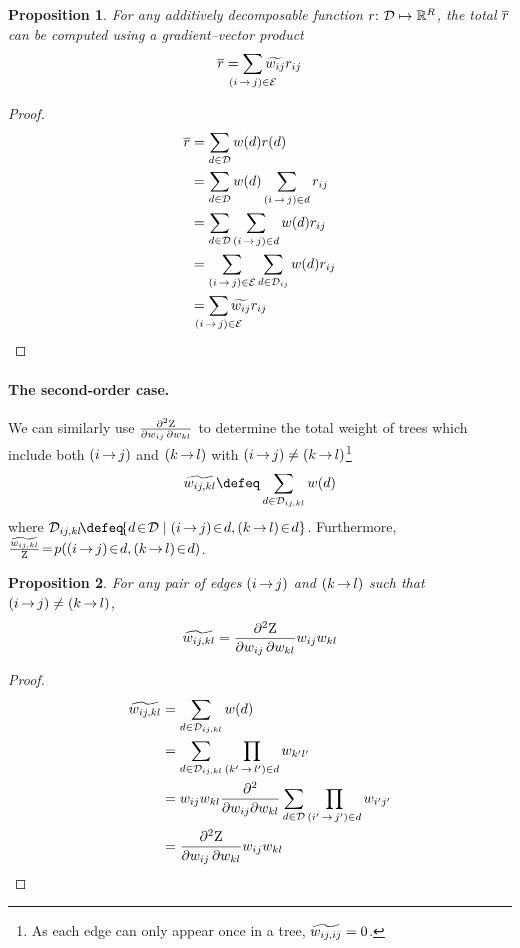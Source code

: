 \documentclass[11pt,a4paper]{article}
\newtheorem{prop}{Proposition}
\theoremstyle{definition}
\begin{document}
\begin{prop}
\label{prop:rbar}
For any additively decomposable function $r{:}\,\,{\mathcal{D}} \mapsto \mathbb{R}^{{R}}$, the total ${\overline{r}}$ can be computed using a gradient--vector product
\begin{equation}
    \rbar = \smashoperator{\sum_{\edgeij\in\edges}}\totalw{ij}\redge{ij}
\end{equation}
\end{prop}
\begin{proof}
\begin{align*}
    \rbar &= \sumtree\wtree{\tree}\rtree{\tree} \\
    &= \sumtree\wtree{\tree}\sum_{\edgeij\in \tree} \redge{ij} \\
    &= \sumtree\sum_{\edgeij\in \tree}\wtree{\tree}\redge{ij} \\
    &= \sum_{\edgeij\in\edges}\sum_{\tree\in\inc{ij}}\wtree{\tree}\redge{ij} \\
    &= \smashoperator{\sum_{\edgeij\in\edges}}\totalw{ij}\redge{ij}
\end{align*}
\end{proof}

\paragraph{The second-order case.}
We can similarly use $\frac{\partial^2 {\mathrm{Z}}}{\partial {w_{ij}}\, \partial {w_{kl}}}$ to determine the total weight of trees which include both ${(i\,{\rightarrow}\,j)}$ and ${(k\,{\rightarrow}\,l)}$ with ${(i\,{\rightarrow}\,j)} \ne {(k\,{\rightarrow}\,l)}$\footnote{As each edge can only appear once in a tree, ${\widetilde{w_{ij,ij}}}=0$.}
\begin{equation}
    \totalw{ij,kl}\defeq\sum_{\tree\in\inc{ij,kl}}\wtree{\tree}
\end{equation}
where $\inc{ij,kl} \!\defeq\! \{ \tree \!\in\! \st \mid \edgeij \!\in\! \tree, \edgekl \!\in\! \tree \}$.
Furthermore, $\frac{{\widetilde{w_{ij,kl}}}}{{\mathrm{Z}}} \!=\! p( {(i\,{\rightarrow}\,j)} \!\in\! {d}, {(k\,{\rightarrow}\,l)} \!\in\! {d})$.

\begin{prop}
\label{prop:second-weight}
For any pair of edges ${(i\,{\rightarrow}\,j)}$ and ${(k\,{\rightarrow}\,l)}$ such that ${(i\,{\rightarrow}\,j)}\neq{(k\,{\rightarrow}\,l)}$,
\begin{equation}\label{eq:total2}
    {\widetilde{w_{ij,kl}}}=\frac{\partial^2 {\mathrm{Z}}}{\partial {w_{ij}}\,\partial{w_{kl}}}{w_{ij}}{w_{kl}}
\end{equation}
\end{prop}
\begin{proof}
\begin{align*}
    {\widetilde{w_{ij,kl}}} &= \sum_{{d}\in{\mathcal{D}_{ij,kl}}}{w({d})} \\
    &= \sum_{{d}\in{\mathcal{D}_{ij,kl}}}\prod_{{(k'\,{\rightarrow}\,l')}\in{d}}{w_{k'l'}} \\
    &= {w_{ij}}{w_{kl}}\frac{\partial^2}{\partial{w_{ij}}\partial{w_{kl}}} \sum_{{d} \in {\mathcal{D}}}\prod_{{(i'\,{\rightarrow}\,j')}\in{d}}{w_{i'j'}} \\
    &= \frac{\partial^2 {\mathrm{Z}}}{\partial {w_{ij}}\,\partial{w_{kl}}}{w_{ij}}{w_{kl}}
\end{align*}
\end{proof}%
\end{document}
